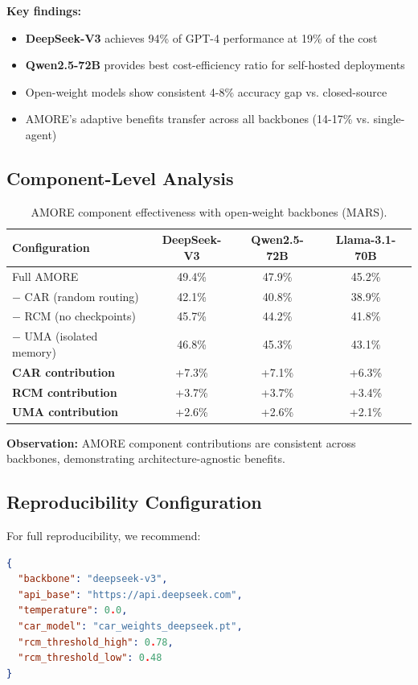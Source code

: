 \documentclass{article}
\theoremstyle{plain}
\theoremstyle{definition}
\theoremstyle{remark}
\begin{document}
\textbf{Key findings:}
\begin{itemize}[nosep,leftmargin=*]
\item \textbf{DeepSeek-V3} achieves 94\% of GPT-4 performance at 19\% of the cost
\item \textbf{Qwen2.5-72B} provides best cost-efficiency ratio for self-hosted deployments
\item Open-weight models show consistent 4-8\% accuracy gap vs. closed-source
\item AMORE's adaptive benefits transfer across all backbones (14-17\% vs. single-agent)
\end{itemize}

\subsection{Component-Level Analysis}

\begin{table}[h]
\centering
\caption{AMORE component effectiveness with open-weight backbones (MARS).}
\label{tab:open-weight-components}
\small
\begin{tabular}{lccc}
\toprule
\textbf{Configuration} & \textbf{DeepSeek-V3} & \textbf{Qwen2.5-72B} & \textbf{Llama-3.1-70B} \\
\midrule
Full AMORE & 49.4\% & 47.9\% & 45.2\% \\
$-$ CAR (random routing) & 42.1\% & 40.8\% & 38.9\% \\
$-$ RCM (no checkpoints) & 45.7\% & 44.2\% & 41.8\% \\
$-$ UMA (isolated memory) & 46.8\% & 45.3\% & 43.1\% \\
\midrule
\textbf{CAR contribution} & +7.3\% & +7.1\% & +6.3\% \\
\textbf{RCM contribution} & +3.7\% & +3.7\% & +3.4\% \\
\textbf{UMA contribution} & +2.6\% & +2.6\% & +2.1\% \\
\bottomrule
\end{tabular}
\end{table}

\textbf{Observation:} AMORE component contributions are consistent across backbones, demonstrating architecture-agnostic benefits.

\subsection{Reproducibility Configuration}

For full reproducibility, we recommend:
\begin{lstlisting}[language=json,basicstyle=\scriptsize\ttfamily]
{
  "backbone": "deepseek-v3",
  "api_base": "https://api.deepseek.com",
  "temperature": 0.0,
  "car_model": "car_weights_deepseek.pt",
  "rcm_threshold_high": 0.78,
  "rcm_threshold_low": 0.48
}
\end{lstlisting}
\end{document}
